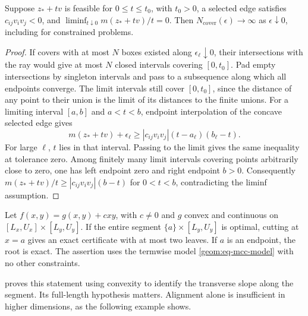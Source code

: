 \begin{proposition}\label{geom:prop-ray}
Suppose $z_*+tv$ is feasible for $0\leq t\leq t_0$, with $t_0>0$, a selected edge
satisfies $c_{ij}v_iv_j<0$, and
$\liminf_{t\downarrow0}m(z_*+tv)/t=0$. Then
$N_{\mathrm{cover}}(\epsilon)\to\infty$ as $\epsilon\downarrow0$,
including for constrained problems.
\end{proposition}
\begin{proof}
If covers with at most $N$ boxes existed along $\epsilon_\ell\downarrow0$,
their intersections with the ray would give at most $N$ closed
intervals covering $[0,t_0]$. Pad empty intersections by singleton
intervals and pass to a subsequence along which all endpoints converge.
The limit intervals still cover $[0,t_0]$, since the distance of any
point to their union is the limit of its distances to the finite unions.
For a limiting interval $[a,b]$ and $a<t<b$, endpoint interpolation
of the concave selected edge gives
\[
 m(z_*+tv)+\epsilon_\ell\geq
           |c_{ij}v_iv_j|(t-a_\ell)(b_\ell-t).
\]
For large $\ell$, $t$ lies in that interval. Passing to the limit
gives the same inequality at tolerance zero. Among finitely many
limit intervals covering points arbitrarily close to zero, one has
left endpoint zero and right endpoint $b>0$. Consequently
$m(z_*+tv)/t\geq|c_{ij}v_iv_j|(b-t)$ for $0<t<b$, contradicting the
liminf assumption.
\end{proof}

\begin{proposition}
\label{geom:prop-aligned-two}
Let $f(x,y)=g(x,y)+cxy$, with $c\ne0$ and $g$ convex and continuous
on $[L_x,U_x]\times[L_y,U_y]$. If the entire segment
$\{a\}\times[L_y,U_y]$ is optimal, cutting at $x=a$ gives an exact
certificate with at most two leaves. If $a$ is an endpoint, the root
is exact. The assertion uses the termwise model
\cref{geom:eq-mcc-model} with no other constraints.
\end{proposition}

 proves this statement using
convexity to identify the transverse slope along the segment. Its
full-length hypothesis matters. Alignment alone is insufficient in
higher dimensions, as the following example shows.

